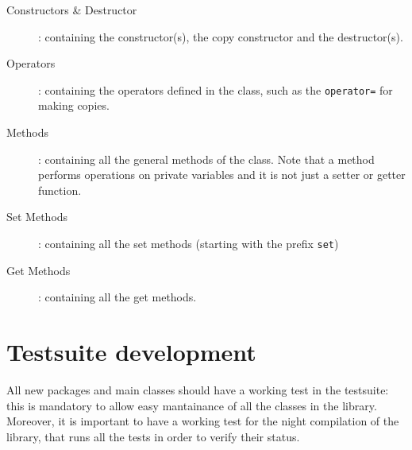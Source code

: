 \documentclass[a4paper]{article}
\begin{document}
\begin{enumerate}
\begin{description}
	  \item[Constructors \& Destructor]: containing the constructor(s), the copy constructor and the destructor(s).
      \item[Operators]: containing the operators defined in the class, such as the \texttt{operator=} for making copies.
      \item[Methods]: containing all the general methods of the class. Note that a method performs operations on private variables and it is not just a setter or getter function.
      \item[Set Methods]: containing all the set methods (starting with the prefix \texttt{set})
      \item[Get Methods]: containing all the get methods.
  \end{description}
\end{enumerate}

\section{Testsuite development} \label{testsuite}
All new packages and main classes should have a working test in the testsuite: this is mandatory to allow easy mantainance of all the classes in the library. Moreover, it is important to have a working test for the night compilation of the library, that runs all the tests in order to verify their status.
\end{document}
